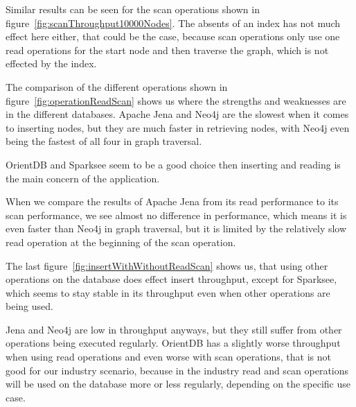 Similar results can be seen for the scan operations shown in figure~\ref{fig:scanThroughput10000Nodes}.
The absents of an index has not much effect here either,
that could be the case,
because scan operations only use one read operations for the start node and then traverse the graph,
which is not effected by the index.

The comparison of the different operations shown in figure~\ref{fig:operationReadScan} shows us where the strengths and weaknesses are in the different databases.
Apache Jena and Neo4j are the slowest when it comes to inserting nodes,
but they are much faster in retrieving nodes,
with Neo4j even being the fastest of all four in graph traversal.

OrientDB and Sparksee seem to be a good choice then inserting and reading is the main concern of the application.

When we compare the results of Apache Jena from its read performance to its scan performance,
we see almost no difference in performance,
which means it is even faster than Neo4j in graph traversal,
but it is limited by the relatively slow read operation at the beginning of the scan operation.

The last figure~\ref{fig:insertWithWithoutReadScan} shows us,
that using other operations on the database does effect insert throughput,
except for Sparksee,
which seems to stay stable in its throughput even when other operations are being used.

Jena and Neo4j are low in throughput anyways,
but they still suffer from other operations being executed regularly.
OrientDB has a slightly worse throughput when using read operations and even worse with scan operations,
that is not good for our industry scenario,
because in the industry read and scan operations will be used on the database more or less regularly,
depending on the specific use case.
